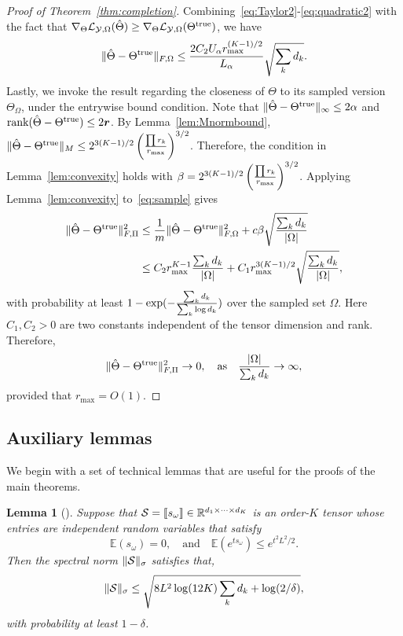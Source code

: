\documentclass[11pt]{article}
\theoremstyle{plain}
\newtheorem{lem}{Lemma}
\theoremstyle{definition}
\begin{document}
\begin{proof}[Proof of Theorem~\ref{thm:completion}]
Combining~\eqref{eq:Taylor2}-\eqref{eq:quadratic2} with the fact that $\nabla_{\Theta}\mathcal{L}_{\mathcal{Y},\Omega}(\hat \Theta)\geq \nabla_{\Theta}\mathcal{L}_{\mathcal{Y},\Omega}(\Theta^{\text{true}})$, we have
\begin{equation}\label{eq:sample}
\lVert\hat \Theta-\Theta^{\text{true}}\rVert_{F,\Omega}\leq {2C_2U_\alpha  r_{\max}^{(K-1)/2} \over L_\alpha} \sqrt{\sum_kd_k}.
\end{equation}
Lastly, we invoke the result regarding the closeness of $\Theta$ to its sampled version $\Theta_{\Omega}$, under the entrywise bound condition. Note that $\lVert\hat\Theta-\Theta^{\text{true}}\rVert_\infty\leq 2\alpha$ and $\text{rank}(\hat \Theta-\Theta^{\text{true}})\leq 2\bm{r}$. By Lemma~\ref{lem:Mnormbound}, $\lVert\hat \Theta-\Theta^{\text{true}}\rVert_M\leq 2^{3(K-1)/2} \left({\prod r_k \over r_{\max}}\right)^{3/2}$. Therefore, the condition in Lemma~\ref{lem:convexity} holds with $\beta=2^{3(K-1)/2} \left({\prod r_k \over r_{\max}}\right)^{3/2}$. Applying Lemma~\ref{lem:convexity} to~\eqref{eq:sample} gives
\begin{align}
 \lVert\hat \Theta-\Theta^{\text{true}}\rVert_{F,\Pi}^2&\leq {1\over m}\lVert\hat \Theta-\Theta^{\text{true}}\rVert_{F,\Omega}^2+c\beta\sqrt{\sum_k d_k\over |\Omega|}\\
 &\leq {C_2  r^{K-1}_{\max}} {\sum_k d_k \over |\Omega|}+C_1 r_{\max}^{3(K-1)/2}\sqrt{\sum_kd_k\over |\Omega|},
\end{align}
with probability at least $1-\exp(-{\sum_kd_k\over \sum_k \log d_k})$ over the sampled set $\Omega$. Here $C_1, C_2>0$ are two constants independent of the tensor dimension and rank. Therefore, 
\[
 \lVert\hat \Theta-\Theta^{\text{true}}\rVert_{F,\Pi}^2\to 0,\quad \text{as}\quad {|\Omega|\over \sum_kd_k}\to \infty,
\]
provided that $r_{\max}=O(1)$.
\end{proof}

\subsection{Auxiliary lemmas}
\label{sec:lemma}

We begin with a set of technical lemmas that are useful for the proofs of the main theorems. 

\begin{lem}[\cite{tomioka2014spectral}]\label{lem:tensor}
Suppose that $\mathcal{S}=\llbracket s_{\omega} \rrbracket\in\mathbb{R}^{d_1\times \cdots \times d_K}$ is an order-$K$ tensor whose entries are independent random variables that satisfy
\[
\mathbb{E}(s_{\omega})=0,\quad \text{and} \quad\mathbb{E}(e^{ts_{\omega}})\leq e^{t^2L^2/2}.
\]
Then the spectral norm $\lVert\mathcal{S}\rVert_\sigma$ satisfies that, 
\[
\lVert\mathcal{S}\rVert_\sigma\leq \sqrt{{8L^2} \log (12K) \sum_k d_k +\log (2/\delta)},
\]
with probability at least $1-\delta$.
\end{lem}
\end{document}
